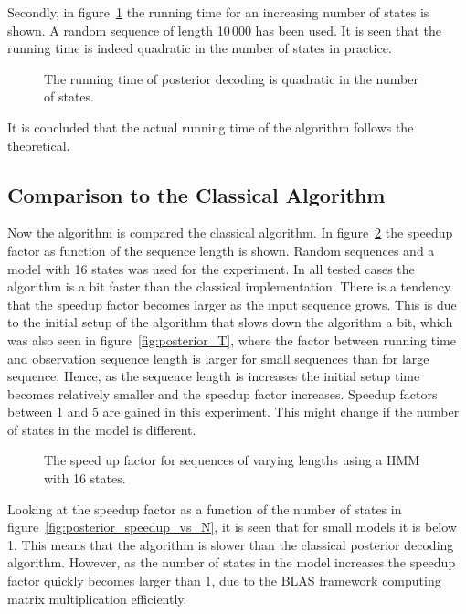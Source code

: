 Secondly, in figure~\ref{fig:posterior_N} the running time for an increasing
number of states is shown. A random sequence of length 10\,000 has been used. It
is seen that the running time is indeed quadratic in the number of states
in practice.

\begin{figure}
  \centering
  
  \caption{The running time of posterior decoding is quadratic in the number of
    states.}
  \label{fig:posterior_N}
\end{figure}

It is concluded that the actual running time of the algorithm follows the
theoretical.

\subsection{Comparison to the Classical Algorithm}
\label{sec:comp-class-algor}

Now the algorithm is compared the classical algorithm. In
figure~\ref{fig:posterior_speedup_vs_sequence_length} the speedup factor as
function of the sequence length is shown. Random sequences and a model with 16
states was used for the experiment. In all tested cases the algorithm is a bit
faster than the classical implementation. There is a tendency that the speedup
factor becomes larger as the input sequence grows. This is due to the initial
setup of the algorithm that slows down the algorithm a bit, which was also seen
in figure~\ref{fig:posterior_T}, where the factor between running time and
observation sequence length is larger for small sequences than for large
sequence. Hence, as the sequence length is increases the initial setup time
becomes relatively smaller and the speedup factor increases. Speedup
factors between 1 and 5 are gained in this experiment. This might change if the
number of states in the model is different.

\begin{figure}
  \centering
  
  \caption{The speed up factor for sequences of varying lengths using a HMM
    with 16 states.}
  \label{fig:posterior_speedup_vs_sequence_length}
\end{figure}

Looking at the speedup factor as a function of the number of states in
figure~\ref{fig:posterior_speedup_vs_N}, it is seen that for small models it is
below 1. This means that the algorithm is slower than the classical posterior
decoding algorithm. However, as the number of states in the model increases the
speedup factor quickly becomes larger than 1, due to the BLAS framework
computing matrix multiplication efficiently.

